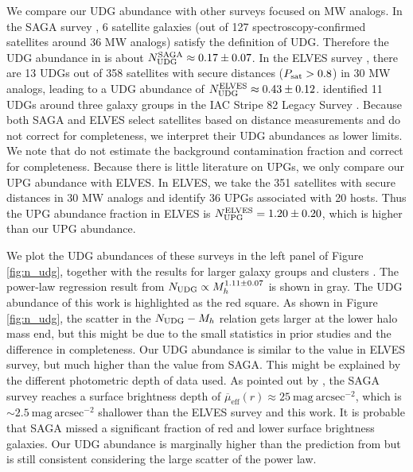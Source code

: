\documentclass[twocolumn,astrosymb,twocolappendix]{aastex631}
\newcommand{\sbunit}{\mathrm{mag\ arcsec}^{-2}}
\newcommand{\sbeffr}{\overline{\mu}_{\mathrm{eff}}(r)}
\begin{document}
\begin{CJK*}{UTF8}{gbsn}
We compare our UDG abundance with other surveys focused on MW analogs. In the SAGA survey \citep{SAGA-II}, 6 satellite galaxies (out of 127 spectroscopy-confirmed satellites around 36 MW analogs) satisfy the definition of UDG. Therefore the UDG abundance in \citet{SAGA-II} is about $N_{\rm UDG}^{\rm SAGA}\approx 0.17\pm0.07$. In the ELVES survey \citep{CarlstenELVES2022}, there are 13 UDGs out of 358 satellites with secure distances ($P_{\rm sat} > 0.8$) in 30 MW analogs, leading to a UDG abundance of $N_{\rm UDG}^{\rm ELVES} \approx 0.43\pm0.12$. \citet{Roman2017b} identified 11 UDGs around three galaxy groups in the IAC Stripe 82 Legacy Survey \citep{Fliri2016}. Because both SAGA and ELVES select satellites based on distance measurements and do not correct for completeness, we interpret their UDG abundances as lower limits. We note that \citet{Roman2017b} do not estimate the background contamination fraction and correct for completeness. Because there is little literature on UPGs, we only compare our UPG abundance with ELVES. In ELVES, we take the 351 satellites with secure distances in 30 MW analogs and identify 36 UPGs associated with 20 hosts. Thus the UPG abundance fraction in ELVES is $N_{\rm UPG}^{\rm ELVES} = 1.20 \pm 0.20$, which is higher than our UPG abundance. 


We plot the UDG abundances of these surveys in the left panel of Figure \ref{fig:n_udg}, together with the results for larger galaxy groups and clusters \citep{Koda2015,Munoz2015,Roman2017a,Roman2017b,Janssens2017,vdBurg2017}. 
The power-law regression result from \citet{vdBurg2017} $N_{\rm UDG} \propto M_h^{1.11\pm 0.07}$ is shown in gray. The UDG abundance of this work is highlighted as the red square. As shown in Figure \ref{fig:n_udg}, the scatter in the $N_{\rm UDG}-M_h$ relation gets larger at the lower halo mass end, but this might be due to the small statistics in prior studies and the difference in completeness. Our UDG abundance is similar to the value in ELVES survey, but much higher than the value from SAGA. This might be explained by the different photometric depth of data used. As pointed out by \citet{CarlstenELVES2022,Font2022}, the SAGA survey reaches a surface brightness depth of $\sbeffr\approx 25\ \sbunit$, which is $\sim 2.5\ \sbunit$ shallower than the ELVES survey and this work. It is probable that SAGA missed a significant fraction of red and lower surface brightness galaxies. Our UDG abundance is marginally higher than the prediction from \citet{vdBurg2017} but is still consistent considering the large scatter of the power law. 


\end{CJK*}
\end{document}
